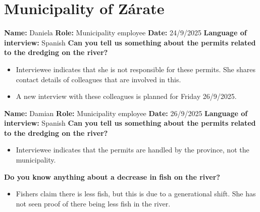 \section{Municipality of Zárate}
\textbf{Name:} Daniela \newline
\textbf{Role:} Municipality employee \newline
\textbf{Date:} 24/9/2025 \newline
\textbf{Language of interview:} Spanish \newline \newline
\textbf{Can you tell us something about the permits related to the dredging on the river?}
\begin{itemize}
    \item Interviewee indicates that she is not responsible for these permits. She shares contact details of colleagues that are involved in this.
    \item A new interview with these colleagues is planned for Friday 26/9/2025.
\end{itemize}

\textbf{Name:} Damian \newline
\textbf{Role:} Municipality employee \newline
\textbf{Date:} 26/9/2025 \newline
\textbf{Language of interview:} Spanish \newline \newline
\textbf{Can you tell us something about the permits related to the dredging on the river?}
\begin{itemize}
    \item Interviewee indicates that the permits are handled by the province, not the municipality.
\end{itemize}

\textbf{Do you know anything about a decrease in fish on the river?}
\begin{itemize}
    \item Fishers claim there is less fish, but this is due to a generational shift. She has not seen proof of there being less fish in the river.
\end{itemize}

